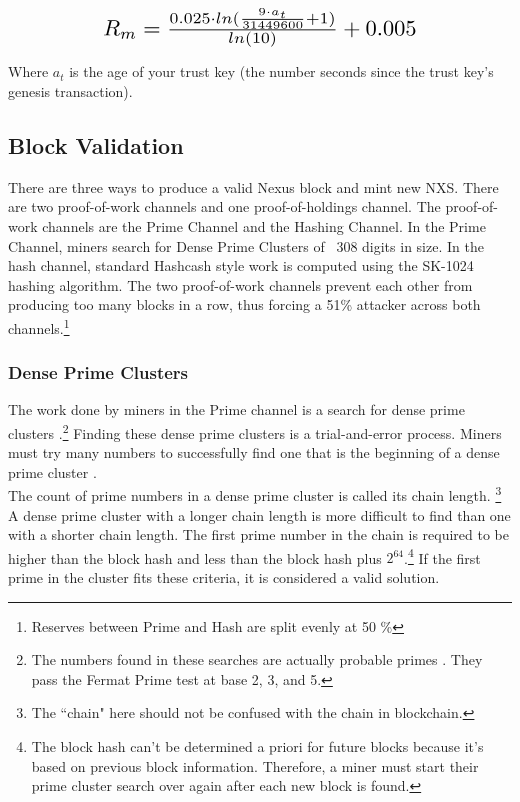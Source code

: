 \documentclass[11pt]{article}
\begin{document}
\paragraph{}
\begin{equation}
\resizebox{.65\hsize}{!}{$R_m = \frac{0.025 \cdot ln(\frac{9 \cdot a_{t}}{31449600} + 1)}{ln(10)} + 0.005$}
\end{equation}

\noindent Where $a_t$ is the age of your trust key (the number seconds since the trust key's genesis transaction).

\subsection{Block Validation}

There are three ways to produce a valid Nexus block and mint new NXS.
There are two proof-of-work channels and one proof-of-holdings channel.
The proof-of-work channels are the Prime Channel and the Hashing Channel.
In the Prime Channel, miners search for Dense Prime Clusters of ~308 digits in size.
In the hash channel, standard Hashcash \cite{hashcash} style work is computed using the SK-1024 hashing algorithm. 
The two proof-of-work channels prevent each other from producing too many blocks in a row, thus forcing a 51\% attacker across both channels.\footnote{Reserves between Prime and Hash are split evenly at 50 \%}

\subsubsection{Dense Prime Clusters}

The work done by miners in the Prime channel is a search for dense prime clusters \cite{wikiprimecluster}.\footnote{The numbers found in these searches are actually probable primes \cite{wikiprobable}. They pass the Fermat Prime test \cite{wikifermat} at base 2, 3, and 5.}
Finding these dense prime clusters is a trial-and-error process.
Miners must try many numbers to successfully find one that is the beginning of a dense prime cluster \cite{wolframprimecluster,primesolominer}.\\ 

\noindent The count of prime numbers in a dense prime cluster is called its chain length.
\footnote{The ``chain" here should not be confused with the chain in blockchain.}
A dense prime cluster with a longer chain length is more difficult to find than one with a shorter chain length.
The first prime number in the chain is required to be higher than the block hash and less than the block hash plus $2^{64}$.\footnote{The block hash can't be determined a priori for future blocks because it's based on previous block information. 
Therefore, a miner must start their prime cluster search over again after each new block is found.}
If the first prime in the cluster fits these criteria, it is considered a valid solution.\\
\end{document}
